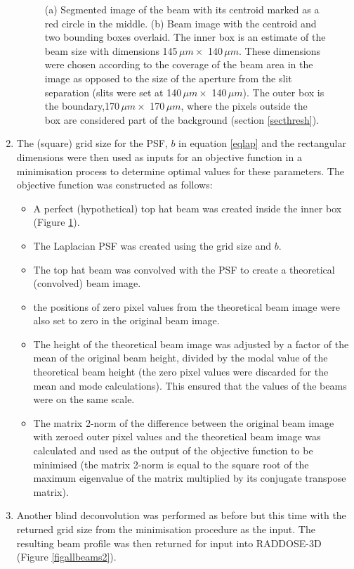 \begin{enumerate}
\begin{figure}
\begin{subfigure}[b]{0.9\textwidth}
                \caption{}
                \label{figbounds}
        \end{subfigure}
        \caption{(a) Segmented image of the beam with its centroid marked as a red circle in the middle.
        (b) Beam image with the centroid and two bounding boxes overlaid.
        The inner box is an estimate of the beam size with dimensions 145$\, \mu m \times$ 140$\, \mu m$.
        These dimensions were chosen according to the coverage of the beam area in the image as opposed to the size of the aperture from the slit separation (slits were set at 140$\,\mu m \times$ 140$\,\mu m$).
        The outer box is the boundary,170$\, \mu m \times$ 170$\, \mu m$, where the pixels outside the box are considered part of the background (section \ref{secthresh}).}
        \label{figimagemanip}
\end{figure}
\item The (square) grid size for the PSF, $b$ in equation \ref{eqlap} and the rectangular dimensions were then used as inputs for an objective function in a minimisation process to determine optimal values for these parameters. The objective function was constructed as follows:
\begin{itemize}
\item A perfect (hypothetical) top hat beam was created inside the inner box (Figure \ref{figbounds}).
\item The Laplacian PSF was created using the grid size and $b$.
\item The top hat beam was convolved with the PSF to create a theoretical (convolved) beam image.
\item the positions of zero pixel values from the theoretical beam image were also set to zero in the original beam image.
\item The height of the theoretical beam image was adjusted by a factor of the mean of the original beam height, divided by the modal value of the theoretical beam height (the zero pixel values were discarded for the mean and mode calculations).
This ensured that the values of the beams were on the same scale.
\item The matrix 2-norm of the difference between the original beam image with zeroed outer pixel values and the theoretical beam image was calculated and used as the output of the objective function to be minimised (the matrix 2-norm is equal to the square root of the maximum eigenvalue of the matrix multiplied by its conjugate transpose matrix).
\end{itemize}
\item Another blind deconvolution was performed as before but this time with the returned grid size from the minimisation procedure as the input.
The resulting beam profile was then returned for input into RADDOSE-3D (Figure \ref{figallbeams2}).
\end{enumerate}

